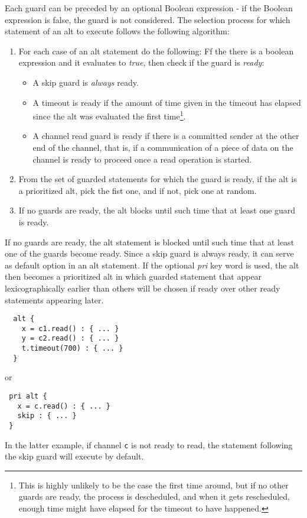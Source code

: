 \documentclass[pdflatex,11pt,letter]{article}
\begin{document}
Each guard can be preceded by an optional Boolean expression - if the Boolean expression is false, the guard is not considered. The selection process for which statement of an alt to execute follows the following algorithm:
\begin{enumerate}
\item For each case of an alt statement do the following: Ff the there is a boolean expression and it evaluates to {\it true}, then check if the guard is {\it ready}:
\begin{itemize}
	\item A skip guard is {\it always} ready.
	\item A timeout is ready if the amount of time given in the timeout has elapsed since the alt was evaluated the first time\footnote{This is highly unlikely to be the case the first time around, but if no other guards are ready, the process is descheduled, and when it gets rescheduled, enough time might have elapsed for the timeout to have happened.}.
	\item A channel read guard is ready if there is a committed sender at the other end of the channel, that is, if a communication of a piece of data on the channel is ready to proceed once a read operation is started.
\end{itemize}
\item From the set of guarded statements for which the guard is ready, if the alt is a prioritized alt, pick the fist one, and if not, pick one at random.
\item If no guards are ready, the alt blocks until such time that at least one guard is ready.
\end{enumerate}
If no guards are ready, the alt statement is blocked until such time that at least one of the guards become ready. Since a skip guard is always ready, it can serve as default option in an alt statement. If the optional {\it pri} key word is used, the alt then becomes a prioritized alt in which guarded statement that appear lexicographically earlier than others will be chosen if ready over other ready statements appearing later.

\begin{verbatim}
  alt {
    x = c1.read() : { ... }
    y = c2.read() : { ... }
    t.timeout(700) : { ... }
  }
\end{verbatim}
or
\begin{verbatim}
 pri alt {
   x = c.read() : { ... }
   skip : { ... }
 }
\end{verbatim}
In the latter example, if channel {\tt c} is not ready to read, the statement following the skip guard will execute by default.
\end{document}
